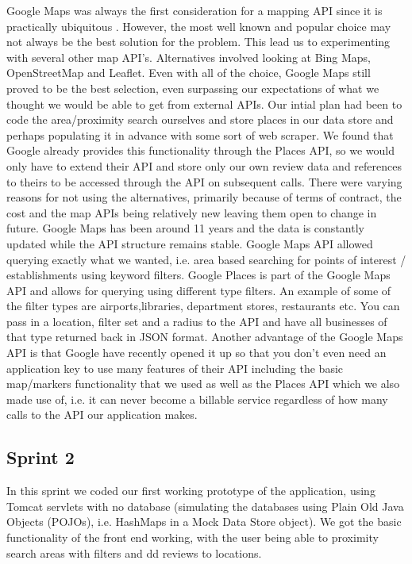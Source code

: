 Google Maps was always the first consideration for a mapping API since it is practically ubiquitous . However, the most well known and popular choice may not always be the best solution for the problem. This lead us to experimenting with several other map API’s. Alternatives involved looking at Bing Maps, OpenStreetMap and Leaflet. Even with all of the choice, Google Maps still proved to be the best selection, even surpassing our expectations of what we thought we would be able to get from external APIs. Our intial plan had been to code the area/proximity search ourselves and store places in our data store and perhaps populating it in advance with some sort of web scraper. We found that Google already provides this functionality through the Places API, so we would only have to extend their API and store only our own review data and references to theirs to be accessed through the API on subsequent calls. There were varying reasons for not using the alternatives, primarily because of terms of contract, the cost and the map APIs being relatively new leaving them open to change in future. Google Maps has been around 11 years and the data is constantly updated while the API structure remains stable. Google Maps API allowed querying exactly what we wanted, i.e. area based searching for points of interest / establishments using keyword filters. Google Places is part of the Google Maps API and allows for querying using different type filters. An example of some of the filter types are airports,libraries, department stores, restaurants etc. You can pass in a location, filter set and a radius to the API and have all businesses of that type returned back in JSON format. Another advantage of the Google Maps API is that Google have recently opened it up so that you don't even need an application key to use many features of their API including the basic map/markers functionality that we used as well as the Places API which we also made use of, i.e. it can never become a billable service regardless of how many calls to the API our application makes.

\subsection{Sprint 2}
In this sprint we coded our first working prototype of the application, using Tomcat servlets with no database (simulating the databases using Plain Old Java Objects (POJOs), i.e. HashMaps in a Mock Data Store object). We got the basic functionality of the front end working, with the user being able to proximity search areas with filters and dd reviews to locations.

